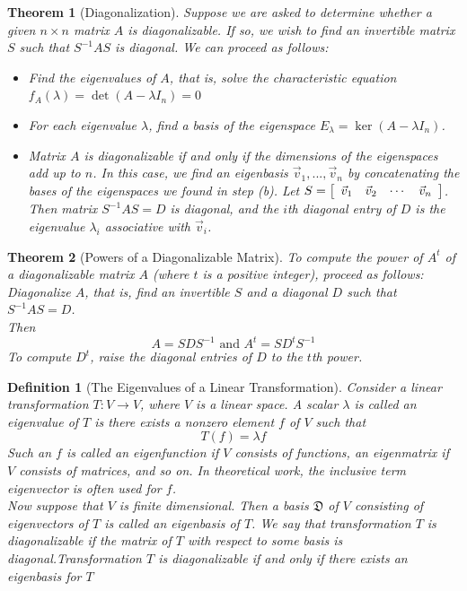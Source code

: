 \documentclass[10pt]{report}
\newtheorem{thm2}{Theorem}[section]
\newtheorem{def2}{Definition}[section]
\begin{document}
\begin{thm2}[Diagonalization]
Suppose we are asked to determine whether a given $n\times n$ matrix $A$ is diagonalizable. If so, we wish to find an invertible matrix $S$ such that $S^{-1}AS$ is diagonal. We can proceed as follows:
\begin{itemize}
\item[a.] Find the eigenvalues of $A$, that is, solve the characteristic equation $f_A(\lambda)=\det(A-\lambda I_n)=0$
\item[b.] For each eigenvalue $\lambda$, find a basis of the eigenspace $E_\lambda=\ker(A-\lambda I_n)$.
\item[c.] Matrix $A$ is diagonalizable if and only if the dimensions of the eigenspaces add up to $n$. In this case, we find an eigenbasis $\vec{v}_1, ...,\vec{v}_n$ by concatenating the bases of the eigenspaces we found in step (b). Let $S=\left[\begin{array}{c c c c}
\vec{v}_1 & \vec{v}_2 & \cdots & \vec{v}_n
\end{array}\right]$. Then matrix $S^{-1}AS=D$ is diagonal, and the $i$th diagonal entry of $D$ is the eigenvalue $\lambda_i$ associative with $\vec{v}_i$.
\end{itemize}
\end{thm2}
\begin{thm2}[Powers of a Diagonalizable Matrix]
To compute the power of $A^t$ of a diagonalizable matrix $A$ (where $t$ is a positive integer), proceed as follows:
Diagonalize $A$, that is, find an invertible $S$ and a diagonal $D$ such that $S^{-1}AS=D$.\\
Then
$$A=SDS^{-1} \text{   and   } A^t=SD^tS^{-1}$$
To compute $D^t$, raise the diagonal entries of $D$ to the $t$th power.
\end{thm2}
\begin{def2}[The Eigenvalues of a Linear Transformation]
Consider a linear transformation $T:V\to V$, where $V$ is a linear space. A scalar $\lambda$ is called an eigenvalue of $T$ is there exists a nonzero element $f$ of $V$ such that
$$T(f)=\lambda f$$
Such an $f$ is called an eigenfunction if $V$ consists of functions, an eigenmatrix if $V$ consists of matrices, and so on. In theoretical work, the inclusive term eigenvector is often used for $f$.\\
Now suppose that $V$ is finite dimensional. Then a basis $\mathfrak{D}$ of $V$ consisting of eigenvectors of $T$ is called an eigenbasis of $T$. We say that transformation $T$ is diagonalizable if the matrix of $T$ with respect to some basis is diagonal.Transformation $T$ is diagonalizable if and only if there exists an eigenbasis for $T$
\end{def2}
\end{document}
